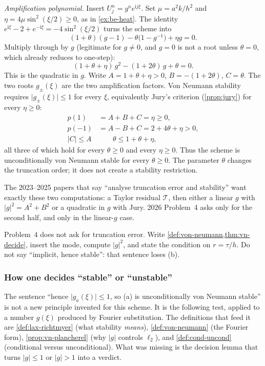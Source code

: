 \documentclass[11pt,a4paper]{article}
\begin{document}
\begin{example}
\emph{Amplification polynomial.} Insert \(U_j^n=g^n e^{\mathrm i j\xi}\). Set \(\mu=a^2 k/h^2\) and \(\eta=4\mu\sin^2(\xi/2)\ge 0\), as in \cref{ex:be-heat}. The identity \(e^{\mathrm i\xi}-2+e^{-\mathrm i\xi}=-4\sin^2(\xi/2)\) turns the scheme into
\[
(1+\theta)(g-1)-\theta\bigl(1-g^{-1}\bigr)+\eta g=0.
\]
Multiply through by \(g\) (legitimate for \(g\neq 0\), and \(g=0\) is not a root unless \(\theta=0\), which already reduces to one-step):
\[
(1+\theta+\eta)\,g^2-(1+2\theta)\,g+\theta=0.
\]
This is the quadratic in \(g\). Write \(A=1+\theta+\eta>0\), \(B=-(1+2\theta)\), \(C=\theta\). The two roots \(g_\pm(\xi)\) are the two amplification factors. Von Neumann stability requires \(\lvert g_\pm(\xi)\rvert\le 1\) for every \(\xi\), equivalently Jury's criterion (\cref{prop:jury}) for every \(\eta\ge 0\):
\begin{align*}
p(1)
&=
A+B+C
=
\eta
\ge 0,
\\
p(-1)
&=
A-B+C
=
2+4\theta+\eta
>0,
\\
\lvert C\rvert\le A
&\qquad
\theta\le 1+\theta+\eta,
\end{align*}
all three of which hold for every \(\theta\ge 0\) and every \(\eta\ge 0\). Thus the scheme is unconditionally von Neumann stable for every \(\theta\ge 0\). The parameter \(\theta\) changes the truncation order; it does not create a stability restriction.

The 2023--2025 papers that say ``analyse truncation error and stability'' want exactly these two computations: a Taylor residual \(\mathcal T\), then either a linear \(g\) with \(\lvert g\rvert^2=A^2+B^2\) or a quadratic in \(g\) with Jury. 2026 Problem~4 asks only for the second half, and only in the linear-\(g\) case.
\end{example}


\begin{examnote}
\label{exnote:p4-script}
Problem~4 does not ask for truncation error. Write \cref{def:von-neumann,thm:vn-decide}, insert the mode, compute \(|g|^2\), and state the condition on \(r=\tau/h\). Do not say ``implicit, hence stable'': that sentence loses (b).
\end{examnote}

\subsubsection{How one decides ``stable'' or ``unstable''}

The sentence ``hence \(\lvert g_a(\xi)\rvert\le 1\), so (a) is unconditionally von Neumann stable'' is not a new principle invented for this scheme. It is the following test, applied to a number \(g(\xi)\) produced by Fourier substitution. The definitions that feed it are \cref{def:lax-richtmyer} (what stability \emph{means}), \cref{def:von-neumann} (the Fourier form), \cref{prop:vn-plancherel} (why \(\lvert g\rvert\) controls \(\ell_2\)), and \cref{def:cond-uncond} (conditional versus unconditional). What was missing is the decision lemma that turns \(\lvert g\rvert\le 1\) or \(\lvert g\rvert>1\) into a verdict.
\end{document}
